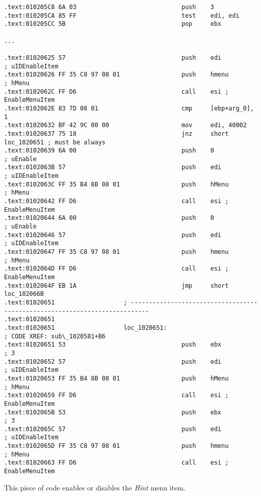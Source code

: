 \begin{lstlisting}[style=customasmx86,caption=Mahjong.exe]
.text:010205C8 6A 03                             push    3
.text:010205CA 85 FF                             test    edi, edi
.text:010205CC 5B                                pop     ebx

...

.text:01020625 57                                push    edi             ; uIDEnableItem
.text:01020626 FF 35 C8 97 08 01                 push    hmenu           ; hMenu
.text:0102062C FF D6                             call    esi ; EnableMenuItem
.text:0102062E 83 7D 08 01                       cmp     [ebp+arg_0], 1
.text:01020632 BF 42 9C 00 00                    mov     edi, 40002
.text:01020637 75 18                             jnz     short loc_1020651 ; must be always
.text:01020639 6A 00                             push    0               ; uEnable
.text:0102063B 57                                push    edi             ; uIDEnableItem
.text:0102063C FF 35 B4 8B 08 01                 push    hMenu           ; hMenu
.text:01020642 FF D6                             call    esi ; EnableMenuItem
.text:01020644 6A 00                             push    0               ; uEnable
.text:01020646 57                                push    edi             ; uIDEnableItem
.text:01020647 FF 35 C8 97 08 01                 push    hmenu           ; hMenu
.text:0102064D FF D6                             call    esi ; EnableMenuItem
.text:0102064F EB 1A                             jmp     short loc_102066B
.text:01020651                   ; ---------------------------------------------------------------------------
.text:01020651
.text:01020651                   loc_1020651:                            ; CODE XREF: sub\_1020581+B6
.text:01020651 53                                push    ebx             ; 3
.text:01020652 57                                push    edi             ; uIDEnableItem
.text:01020653 FF 35 B4 8B 08 01                 push    hMenu           ; hMenu
.text:01020659 FF D6                             call    esi ; EnableMenuItem
.text:0102065B 53                                push    ebx             ; 3
.text:0102065C 57                                push    edi             ; uIDEnableItem
.text:0102065D FF 35 C8 97 08 01                 push    hmenu           ; hMenu
.text:01020663 FF D6                             call    esi ; EnableMenuItem
\end{lstlisting}

This piece of code enables or disables the \emph{Hint} menu item.

